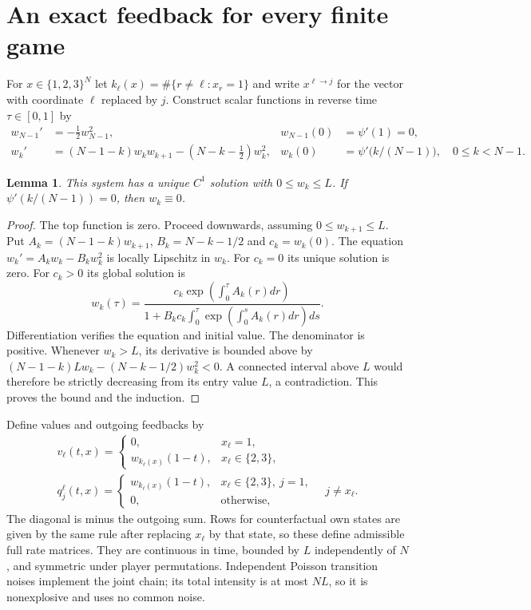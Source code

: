 \documentclass[11pt,a4paper]{article}
\newtheorem{lemma}{Lemma}
\begin{document}
\section{An exact feedback for every finite game}
For $x\in\{1,2,3\}^N$ let
$k_\ell(x)=\#\{r\ne\ell:x_r=1\}$ and write $x^{\ell\to j}$ for
the vector with coordinate $\ell$ replaced by $j$.
Construct scalar functions in reverse time $\tau\in[0,1]$ by
\begin{align}
 w_{N-1}'&=-\tfrac12w_{N-1}^2,& w_{N-1}(0)&=\psi'(1)=0,\label{ode-top}\\
 w_k'&=(N-1-k)w_k w_{k+1}-(N-k-\tfrac12)w_k^2,
 &w_k(0)&=\psi'\bigl(k/(N-1)\bigr),\quad 0\le k<N-1.
 \label{ode}
\end{align}
\begin{lemma}\label{ode-lemma}
This system has a unique $C^1$ solution with $0\le w_k\le L$.
If $\psi'(k/(N-1))=0$, then $w_k\equiv0$.
\end{lemma}
\begin{proof}
The top function is zero. Proceed downwards, assuming
$0\le w_{k+1}\le L$. Put $A_k=(N-1-k)w_{k+1}$,
$B_k=N-k-1/2$ and $c_k=w_k(0)$. The equation
$w_k'=A_kw_k-B_kw_k^2$ is locally Lipschitz in $w_k$.
For $c_k=0$ its unique solution is zero. For $c_k>0$ its global solution is
\[
 w_k(\tau)=\frac{c_k\exp(\int_0^\tau A_k(r)dr)}
 {1+B_kc_k\int_0^\tau\exp(\int_0^s A_k(r)dr)ds}.
\]
Differentiation verifies the equation and initial value. The denominator
is positive. Whenever $w_k>L$, its derivative is bounded above by
$(N-1-k)Lw_k-(N-k-1/2)w_k^2<0$. A connected interval above $L$
would therefore be strictly decreasing from its entry value $L$,
a contradiction. This proves the bound and the induction.
\end{proof}

Define values and outgoing feedbacks by
\begin{equation}\label{values}
 \begin{aligned}
 v_\ell(t,x)=\begin{cases}0,&x_\ell=1,\\
 w_{k_\ell(x)}(1-t),&x_\ell\in\{2,3\},\end{cases}
 \\[3pt]
 q_j^\ell(t,x)=\begin{cases}
 w_{k_\ell(x)}(1-t),&x_\ell\in\{2,3\},\ j=1,\\
 0,&\text{otherwise},
 \end{cases}\quad j\ne x_\ell.
 \end{aligned}
\end{equation}
The diagonal is minus the outgoing sum. Rows for counterfactual own
states are given by the same rule after replacing $x_\ell$ by that
state, so these define admissible full rate matrices. They are continuous
in time, bounded by $L$ independently of $N$, and symmetric under
player permutations. Independent Poisson transition noises implement
the joint chain; its total intensity is at most $NL$, so it is
nonexplosive and uses no common noise.
\end{document}
